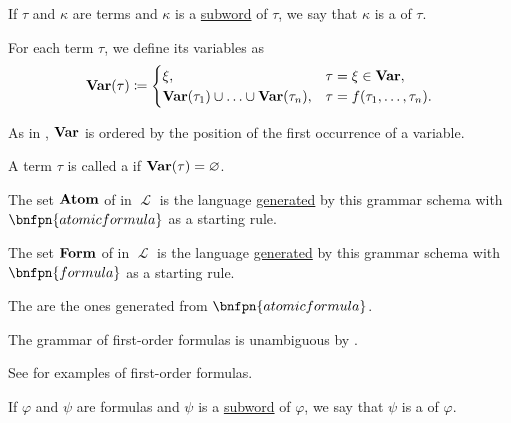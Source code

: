 \begin{definition}
\begin{thmenum}
     If \( \tau \) and \( \kappa \) are terms and \( \kappa \) is a \hyperref[def:language/subword]{subword} of \( \tau \), we say that \( \kappa \) is a  of \( \tau \).

     For each term \( \tau \), we define its variables as
    \begin{equation}\label{eq:def:first_order_syntax/term_variables}
      \operatorname{\mathbf{Var}}(\tau) \coloneqq \begin{cases}
        \xi,                                                        &\tau = \xi \in \operatorname{\mathbf{Var}}, \\
        \operatorname{\mathbf{Var}}(\tau_1) \cup \ldots \cup \operatorname{\mathbf{Var}}(\tau_n), &\tau = f(\tau_1, \ldots, \tau_n).
      \end{cases}
    \end{equation}

    As in , \( \operatorname{\mathbf{Var}} \) is ordered by the position of the first occurrence of a variable.

     A term \( \tau \) is called a  if \( \operatorname{\mathbf{Var}}(\tau) = \varnothing \).

     The set \( \operatorname{\mathbf{Atom}} \) of  in \( \mscrL \) is the language \hyperref[def:grammar_derivation/grammar_language]{generated} by this grammar schema with \( \bnfpn{atomic formula} \) as a starting rule.

     The set \( \operatorname{\mathbf{Form}} \) of  in \( \mscrL \) is the language \hyperref[def:grammar_derivation/grammar_language]{generated} by this grammar schema with \( \bnfpn{formula} \) as a starting rule.

    The  are the ones generated from \( \bnfpn{atomic formula} \).

    The grammar of first-order formulas is unambiguous by .

    See  for examples of first-order formulas.

     If \( \varphi \) and \( \psi \) are formulas and \( \psi \) is a \hyperref[def:language/subword]{subword} of \( \varphi \), we say that \( \psi \) is a  of \( \varphi \).


\end{thmenum}
\end{definition}
